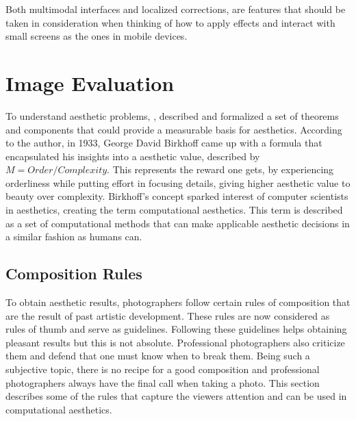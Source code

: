 Both multimodal interfaces and localized corrections, are features that should be taken in consideration when thinking of how to apply effects and interact with small screens as the ones in mobile devices.


\section{Image Evaluation}
\label{sec:photo_eval}
To understand aesthetic problems, \citeauthor{hoenig2005defining} \cite{hoenig2005defining}, described and formalized a set of theorems and components that could provide a measurable basis for aesthetics.
According to the author, in 1933, George David Birkhoff came up with a formula that encapsulated his insights into a aesthetic value, described by $ M = Order/Complexity $. This represents the reward one gets, by experiencing orderliness while putting effort in focusing details, giving higher aesthetic value to beauty over complexity. Birkhoff's concept sparked interest of computer scientists in aesthetics, creating the term computational aesthetics. This term is described as a set of computational methods that can make applicable aesthetic decisions in a similar fashion as humans can.

\subsection{Composition Rules}
\label{sub:photo_rules}

To obtain aesthetic results, photographers follow certain rules of composition that are the result of past artistic development. These rules are now considered as rules of thumb and serve as guidelines. Following these guidelines helps obtaining pleasant results but this is not absolute. Professional photographers also criticize them and defend that one must know when to break them.
Being such a subjective topic, there is no recipe for a good composition and professional photographers always have the final call when taking a photo. This section describes some of the rules that capture the viewers attention and can be used in computational aesthetics.

